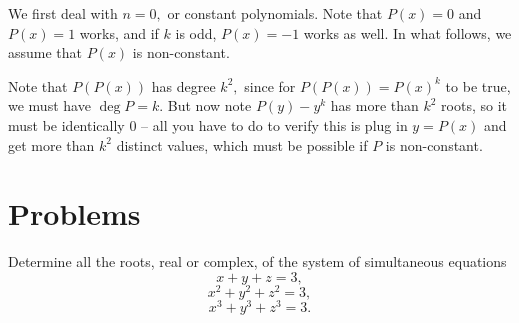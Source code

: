 \documentclass{article}
\begin{document}
\begin{sol}
We first deal with $n=0,$ or constant polynomials. Note that $P(x)=0$ and $P(x)=1$ works, and if $k$ is odd, $P(x)=-1$ works as well. In what follows, we assume that $P(x)$ is non-constant.

Note that $P(P(x))$ has degree $k^2,$ since for $P(P(x))=P(x)^k$ to be true, we must have $\deg P = k.$ But now note $P(y)-y^k$ has more than $k^2$ roots, so it must be identically $0$ -- all you have to do to verify this is plug in $y=P(x)$ and get more than $k^2$ distinct values, which must be possible if $P$ is non-constant.
\end{sol}

\pagebreak

\section{Problems}


\begin{prob}[USAMO 1973/4]{2}
Determine all the roots, real or complex, of the system of simultaneous equations
\[x+y+z=3,\]
\[x^2+y^2+z^2=3,\]
\[x^3+y^3+z^3=3.\]
\end{prob}
\end{document}
